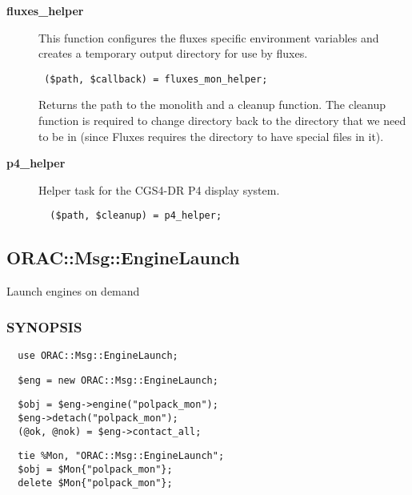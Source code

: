 \begin{description}
\item[\textbf{fluxes\_helper}] \mbox{}

This function configures the fluxes specific environment variables
and creates a temporary output directory for use by fluxes.

\begin{verbatim}
 ($path, $callback) = fluxes_mon_helper;
\end{verbatim}


Returns the path to the monolith and a cleanup function.
The cleanup function is required to change directory back to the
directory that we need to be in (since Fluxes requires the directory
to have special files in it).

\item[\textbf{p4\_helper}] \mbox{}

Helper task for the CGS4-DR P4 display system.

\begin{verbatim}
  ($path, $cleanup) = p4_helper;
\end{verbatim}
\end{description}


\subsection{ORAC::Msg::EngineLaunch\label{ORAC::Msg::EngineLaunch}}

Launch engines on demand

\subsubsection*{SYNOPSIS\label{ORAC::Msg::EngineLaunch_SYNOPSIS}}\begin{verbatim}
  use ORAC::Msg::EngineLaunch;
\end{verbatim}
\begin{verbatim}
  $eng = new ORAC::Msg::EngineLaunch;
\end{verbatim}
\begin{verbatim}
  $obj = $eng->engine("polpack_mon");
  $eng->detach("polpack_mon");
  (@ok, @nok) = $eng->contact_all;
\end{verbatim}
\begin{verbatim}
  tie %Mon, "ORAC::Msg::EngineLaunch";
  $obj = $Mon{"polpack_mon"};
  delete $Mon{"polpack_mon"};
\end{verbatim}
